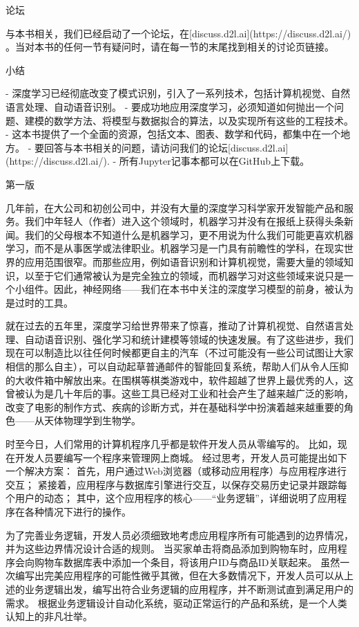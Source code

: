  论坛

与本书相关，我们已经启动了一个论坛，在[discuss.d2l.ai](https://discuss.d2l.ai/)
。当对本书的任何一节有疑问时，请在每一节的末尾找到相关的讨论页链接。

 小结

- 深度学习已经彻底改变了模式识别，引入了一系列技术，包括计算机视觉、自然语言处理、自动语音识别。
- 要成功地应用深度学习，必须知道如何抛出一个问题、建模的数学方法、将模型与数据拟合的算法，以及实现所有这些的工程技术。
- 这本书提供了一个全面的资源，包括文本、图表、数学和代码，都集中在一个地方。
- 要回答与本书相关的问题，请访问我们的论坛[discuss.d2l.ai](https://discuss.d2l.ai/).
- 所有Jupyter记事本都可以在GitHub上下载。


第一版

几年前，在大公司和初创公司中，并没有大量的深度学习科学家开发智能产品和服务。我们中年轻人（作者）进入这个领域时，机器学习并没有在报纸上获得头条新闻。我们的父母根本不知道什么是机器学习，更不用说为什么我们可能更喜欢机器学习，而不是从事医学或法律职业。机器学习是一门具有前瞻性的学科，在现实世界的应用范围很窄。而那些应用，例如语音识别和计算机视觉，需要大量的领域知识，以至于它们通常被认为是完全独立的领域，而机器学习对这些领域来说只是一个小组件。因此，神经网络——我们在本书中关注的深度学习模型的前身，被认为是过时的工具。

就在过去的五年里，深度学习给世界带来了惊喜，推动了计算机视觉、自然语言处理、自动语音识别、强化学习和统计建模等领域的快速发展。有了这些进步，我们现在可以制造比以往任何时候都更自主的汽车（不过可能没有一些公司试图让大家相信的那么自主），可以自动起草普通邮件的智能回复系统，帮助人们从令人压抑的大收件箱中解放出来。在围棋等棋类游戏中，软件超越了世界上最优秀的人，这曾被认为是几十年后的事。这些工具已经对工业和社会产生了越来越广泛的影响，改变了电影的制作方式、疾病的诊断方式，并在基础科学中扮演着越来越重要的角色——从天体物理学到生物学。

时至今日，人们常用的计算机程序几乎都是软件开发人员从零编写的。 比如，现在开发人员要编写一个程序来管理网上商城。 经过思考，开发人员可能提出如下一个解决方案： 首先，用户通过Web浏览器（或移动应用程序）与应用程序进行交互； 紧接着，应用程序与数据库引擎进行交互，以保存交易历史记录并跟踪每个用户的动态； 其中，这个应用程序的核心——“业务逻辑”，详细说明了应用程序在各种情况下进行的操作。

为了完善业务逻辑，开发人员必须细致地考虑应用程序所有可能遇到的边界情况，并为这些边界情况设计合适的规则。 当买家单击将商品添加到购物车时，应用程序会向购物车数据库表中添加一个条目，将该用户ID与商品ID关联起来。 虽然一次编写出完美应用程序的可能性微乎其微，但在大多数情况下，开发人员可以从上述的业务逻辑出发，编写出符合业务逻辑的应用程序，并不断测试直到满足用户的需求。 根据业务逻辑设计自动化系统，驱动正常运行的产品和系统，是一个人类认知上的非凡壮举。

